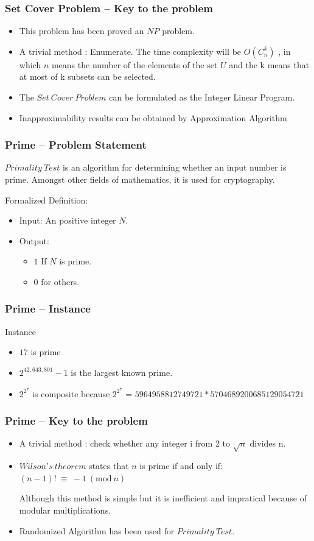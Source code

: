 \documentclass[slidestop,compress,mathserif]{beamer}
\begin{document}
\frame
{
\frametitle{Set Cover Problem -- Key to the problem}
\begin{itemize}
 \item This problem has been proved an $NP$ problem.
 \item A trivial method : Enumerate. The time complexity will be $O(C^k_n)$ , in which $n$ means the number of the elements of the set $U$ and the  k means that at most of k subsets can be selected.
 \item The $Set \ Cover \ Problem $ can be formulated as the Integer Linear Program.
 \item Inapproximability results can be obtained by Approximation Algorithm 
\end{itemize}

}

\frame
{
\frametitle{Prime -- Problem Statement}
$Primality \ Test$ is an algorithm for determining whether an input number is prime. Amongst other fields of mathematics, it is used for cryptography. 
\begin{block}{Formalized Definition:}
\begin{itemize}
 \item Input: 
An positive integer $N$.

 \item Output: 
\begin{itemize}
  \item $1$ If $N$ is prime.
  \item $0$ for others.
\end{itemize}

\end{itemize}
\end{block}
}

\frame
{
\frametitle{Prime -- Instance}
\begin{block}{Instance}
\begin{itemize}
 \item $17$ is prime 
 \item $2^{42,643,801}-1$ is the largest known prime.
 \item $2^{2^7}$ is composite because $2^{2^7}$ = $5964958812749721*5704689200685129054721$
\end{itemize}

\end{block}

}
\frame
{


\frametitle{Prime -- Key to the problem}
\begin{itemize}
 \item A trivial method : check whether any integer i from 2 to $\sqrt{n}$ divides n.
 \item $Wilson's \ theorem$ states that $n$ is prime if and only if:
 $(n-1)!\ \equiv\ -1\ (\mbox{mod}\ n)$

Although this method is simple but it is inefficient and impratical because of modular multiplications.
 \item Randomized Algorithm has been used for $Primality \ Test$.
\end{itemize}

}
\end{document}
